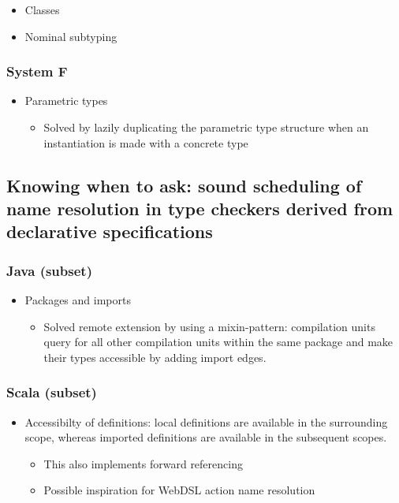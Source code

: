         \begin{itemize}
          \item Classes
          \item Nominal subtyping
        \end{itemize}

      \subsubsection{System F}

        \begin{itemize}
          \item Parametric types
          \begin{itemize}
            \item Solved by lazily duplicating the parametric type structure when an instantiation is made with a concrete type
          \end{itemize}
        \end{itemize}

    \subsection{Knowing when to ask: sound scheduling of name resolution in type checkers derived from declarative specifications}

      \subsubsection{Java (subset)}

        \begin{itemize}
          \item Packages and imports
          \begin{itemize}
            \item Solved remote extension by using a mixin-pattern: compilation units query for all other compilation units within the same package and make their types accessible by adding import edges.
          \end{itemize}
        \end{itemize}

      \subsubsection{Scala (subset)}

        \begin{itemize}
          \item Accessibilty of definitions: local definitions are available in the surrounding scope, whereas imported definitions are available in the subsequent scopes.
          \begin{itemize}
            \item This also implements forward referencing
            \item Possible inspiration for WebDSL action name resolution
          \end{itemize}
        \end{itemize}

